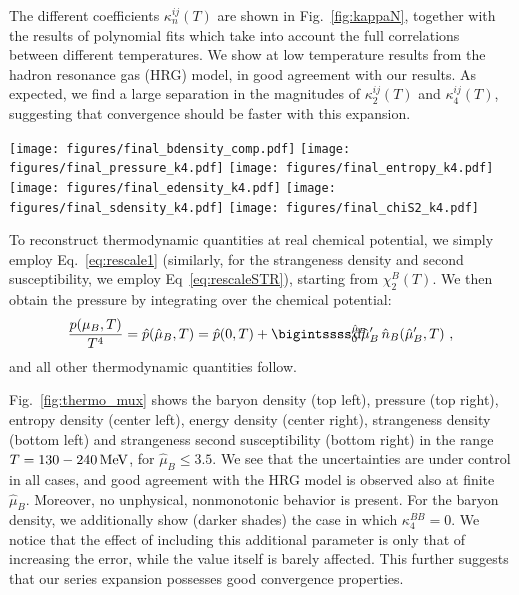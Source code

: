 \documentclass[a4paper,11pt]{article}
\newcommand{\MeV}{\, {\rm MeV}}
\newcommand \hmu {\hat{\mu}}
\begin{document}
The different coefficients $\kappa_n^{ij}(T)$ are shown in Fig.~\ref{fig:kappaN}, 
together with the results of polynomial fits which take into account the full correlations
between different temperatures. We show at low temperature results from the 
hadron resonance gas (HRG) model, in good agreement with our results. 
As expected, we find a large separation in the magnitudes of $\kappa_2^{ij}(T)$ and 
$\kappa_4^{ij} (T)$, suggesting that convergence should be faster with this expansion.

\begin{figure*}[!]
\texttt{[image: figures/final\_bdensity\_comp.pdf]}
\texttt{[image: figures/final\_pressure\_k4.pdf]}
\texttt{[image: figures/final\_entropy\_k4.pdf]}
\texttt{[image: figures/final\_edensity\_k4.pdf]}
\texttt{[image: figures/final\_sdensity\_k4.pdf]}
\texttt{[image: figures/final\_chiS2\_k4.pdf]}
\caption{From top to bottom, left to right: baryon density, pressure, entropy density, 
energy density, strangeness density and strangeness second susceptibility. The results
are shown at increasing values of $\hmu_B$. 
With solid lines we show the results from the HRG model. For the baryon density we also 
show in darker shades the results obtained by setting $\kappa_4^{BB} \equiv 0$.}
\label{fig:thermo_mux}
\end{figure*}

To reconstruct thermodynamic quantities at real chemical potential, we simply
employ Eq.~\eqref{eq:rescale1} (similarly, for the strangeness density and second 
susceptibility, we employ Eq~\eqref{eq:rescaleSTR}), starting from $\chi_2^B(T)$. We 
then obtain the pressure by integrating over the chemical potential:
\begin{equation}
\frac{p(\mu_B,T)}{T^4} = \hat{p}(\hmu_B,T) = \hat{p}(0,T) + \bigintssss_0^{\hmu_B} \!\!\!\!\!\! {\rm d} \hmu^\prime_B \, \hat{n}_B (\hmu_B^\prime,T) \, \, ,
\end{equation}
and all other thermodynamic quantities follow.


Fig.~\ref{fig:thermo_mux} shows the baryon density (top left), pressure (top right), entropy density (center left), energy density (center right), strangeness density (bottom left) and strangeness second susceptibility (bottom right) in the range 
$T = 130-240 \MeV$, for $\hmu_B \leq 3.5$. We see that the uncertainties are under 
control in all cases, and good agreement with the HRG model is observed also at finite 
$\hmu_B$. Moreover, no unphysical, nonmonotonic behavior is present. For the baryon
density, we additionally show (darker shades) the case in which $\kappa_4^{BB}=0$. We
notice that the effect of including this additional parameter is only that of increasing the
error, while the value itself is barely affected. This further suggests that our series 
expansion possesses good convergence properties.
\end{document}
